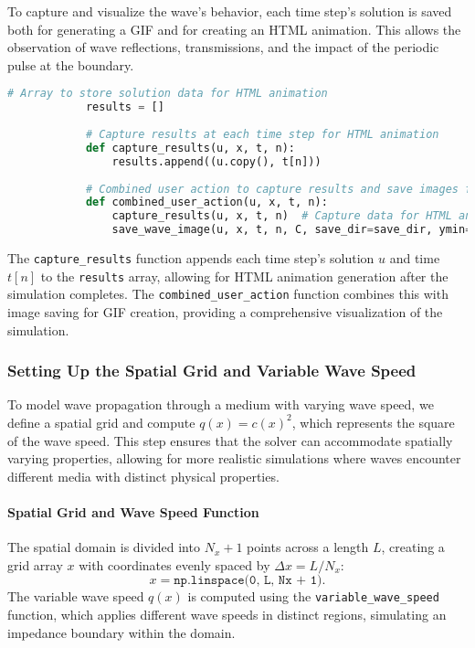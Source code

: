 \documentclass{article}
\begin{document}
		To capture and visualize the wave’s behavior, each time step’s solution is saved both for generating a GIF and for creating an HTML animation. This allows the observation of wave reflections, transmissions, and the impact of the periodic pulse at the boundary.
		
		\begin{lstlisting}[language=Python]
			# Array to store solution data for HTML animation
			results = []
			
			# Capture results at each time step for HTML animation
			def capture_results(u, x, t, n):
				results.append((u.copy(), t[n]))
			
			# Combined user action to capture results and save images for GIF creation
			def combined_user_action(u, x, t, n):
				capture_results(u, x, t, n)  # Capture data for HTML animation
				save_wave_image(u, x, t, n, C, save_dir=save_dir, ymin=-0.6, ymax=0.7)  # Save image for GIF
		\end{lstlisting}
		
		The \texttt{capture\_results} function appends each time step’s solution \( u \) and time \( t[n] \) to the \texttt{results} array, allowing for HTML animation generation after the simulation completes. The \texttt{combined\_user\_action} function combines this with image saving for GIF creation, providing a comprehensive visualization of the simulation.
		
		\subsubsection{Setting Up the Spatial Grid and Variable Wave Speed}
		
		To model wave propagation through a medium with varying wave speed, we define a spatial grid and compute \( q(x) = c(x)^2 \), which represents the square of the wave speed. This step ensures that the solver can accommodate spatially varying properties, allowing for more realistic simulations where waves encounter different media with distinct physical properties.
		
		\paragraph{Spatial Grid and Wave Speed Function}
		
		The spatial domain is divided into \( N_x + 1 \) points across a length \( L \), creating a grid array \( x \) with coordinates evenly spaced by \( \Delta x = L / N_x \):
		\[
		x = \texttt{np.linspace(0, L, Nx + 1)}.
		\]
		The variable wave speed \( q(x) \) is computed using the \texttt{variable\_wave\_speed} function, which applies different wave speeds in distinct regions, simulating an impedance boundary within the domain.
		
\end{document}
